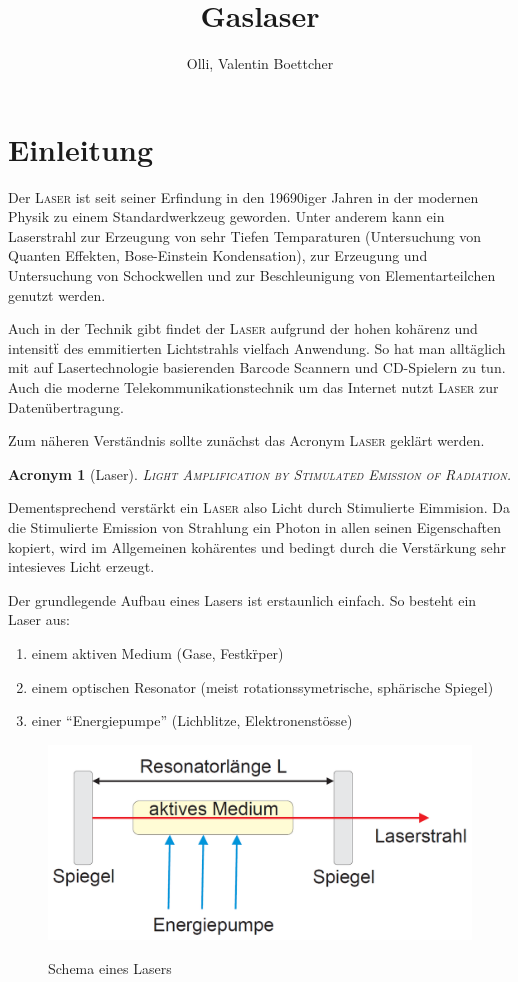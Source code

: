 \documentclass[slug=GL, room=HZDR\ Dresden/Rossendorf\,\ Geb.\ 620/123, supervisor=Martin\ Rehwald;\, Tim\ Ziegler]{../../Lab_Report_LaTeX/lab_report}
\title{Gaslaser}
\author{Olli, Valentin Boettcher}
\newcommand{\laser}{\textsc{Laser}}
\newtheorem{acro}{Acronym}[section]
\begin{document}
\maketitle

\section{Einleitung}%
\label{sec:intro}
Der \laser{} ist seit seiner Erfindung in den 19690iger Jahren in der
modernen Physik zu einem Standardwerkzeug geworden.  Unter anderem
kann ein Laserstrahl zur Erzeugung von sehr Tiefen Temparaturen
(Untersuchung von Quanten Effekten, Bose-Einstein Kondensation), zur
Erzeugung und Untersuchung von Schockwellen und zur Beschleunigung von
Elementarteilchen genutzt werden.

 Auch in der Technik gibt findet der \laser{} aufgrund
der hohen koh\"arenz und intensit\"t des emmitierten Lichtstrahls
vielfach Anwendung. So hat man allt\"aglich mit auf Lasertechnologie
basierenden Barcode Scannern und CD-Spielern zu tun. Auch die moderne
Telekommunikationstechnik um das Internet nutzt \laser{} zur
Daten\"ubertragung.

Zum n\"aheren Verst\"andnis sollte zun\"achst das Acronym \laser{}
gekl\"art werden.

\begin{acro}[Laser]
\textsc{Light Amplification by Stimulated Emission of Radiation.}
\end{acro}

Dementsprechend verst\"arkt ein \laser{} also Licht durch Stimulierte
Eimmision. Da die Stimulierte Emission von Strahlung ein Photon in
allen seinen Eigenschaften kopiert, wird im Allgemeinen koh\"arentes
und bedingt durch die Verst\"arkung sehr intesieves Licht erzeugt.

Der grundlegende Aufbau eines Lasers ist erstaunlich einfach. So
besteht ein Laser aus:

\begin{enumerate}
\item einem aktiven Medium (Gase, Festk\"rper)
\item einem optischen Resonator (meist rotationssymetrische, sph\"arische Spiegel)
\item einer ``Energiepumpe'' (Lichblitze, Elektronenst\"osse)
\end{enumerate}

\begin{figure}[H]\centering\label{fig:aufb}
  \includegraphics[width=.5\columnwidth]{schema.png}
  \caption[Aufbau]{Schema eines Lasers}
\end{figure}
\end{document}
